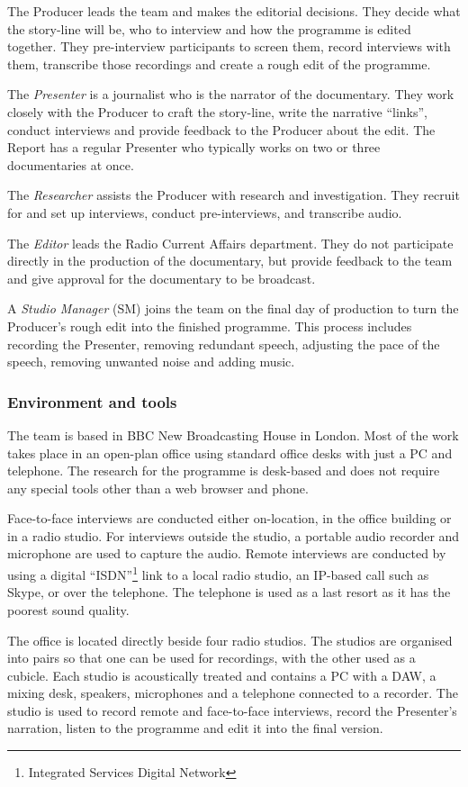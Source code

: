 The Producer leads the team and makes the editorial decisions. They decide what the story-line will be, who to interview
and how the programme is edited together. They pre-interview participants to screen them, record interviews with
them, transcribe those recordings and create a rough edit of the programme.

The \textit{Presenter} is a journalist who is the narrator of the documentary. They work closely with the Producer to
craft the story-line, write the narrative ``links'', conduct interviews and provide feedback to the Producer about the
edit. The Report has a regular Presenter who typically works on two or three documentaries at once.

The \textit{Researcher} assists the Producer with research and investigation. They recruit for and set up interviews,
conduct pre-interviews, and transcribe audio. 

The \textit{Editor} leads the Radio Current Affairs department. They do not participate directly in the production of
the documentary, but provide feedback to the team and give approval for the documentary to be broadcast.

A \textit{Studio Manager} (SM) joins the team on the final day of production to turn the Producer's rough edit into
the finished programme. This process includes recording the Presenter, removing redundant speech, adjusting the pace of
the speech, removing unwanted noise and adding music.

\subsubsection{Environment and tools}
The team is based in BBC New Broadcasting House in London. Most of the work takes place in an open-plan office using
standard office desks with just a PC and telephone. The research for the programme is desk-based and does not require
any special tools other than a web browser and phone.

Face-to-face interviews are conducted either on-location, in the office building or in a radio studio.  For interviews
outside the studio, a portable audio recorder and microphone are used to capture the audio.  Remote interviews are
conducted by using a digital ``ISDN''\footnote{Integrated Services Digital Network} link to a local radio studio, an
IP-based call such as Skype, or over the telephone. The telephone is used as a last resort as it has the poorest sound
quality.

The office is located directly beside four radio studios. The studios are organised into pairs so that one can be used
for recordings, with the other used as a cubicle. Each studio is acoustically treated and contains a PC with a DAW,
a mixing desk, speakers, microphones and a telephone connected to a recorder. The studio is used to record remote and
face-to-face interviews, record the Presenter's narration, listen to the programme and edit it into the final
version.

